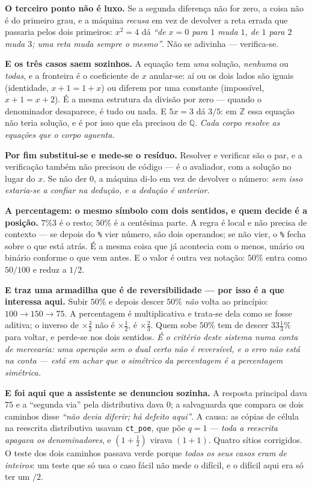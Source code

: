 \documentclass[11pt]{article}
\newcommand{\code}[1]{\texttt{\small #1}}
\theoremstyle{plain}
\theoremstyle{remark}
\begin{document}
\begin{itemize}
\textbf{O terceiro ponto não é luxo.} Se a segunda diferença não for zero, a coisa não é do
primeiro grau, e a máquina \emph{recusa} em vez de devolver a reta errada que passaria pelos dois
primeiros: $x^2 = 4$ dá \emph{``de $x{=}0$ para $1$ muda $1$, de $1$ para $2$ muda $3$; uma reta
muda sempre o mesmo''}. Não se adivinha --- verifica-se.

\textbf{E os três casos saem sozinhos.} A equação tem \emph{uma} solução, \emph{nenhuma} ou
\emph{todas}, e a fronteira é o coeficiente de $x$ anular-se: aí ou os dois lados são iguais
(identidade, $x+1 = 1+x$) ou diferem por uma constante (impossível, $x+1 = x+2$). É a mesma
estrutura da divisão por zero --- quando o denominador desaparece, é tudo ou nada. E $5x = 3$ dá
$3/5$: em $\mathbb{Z}$ essa equação não teria solução, e é por isso que ela precisou de
$\mathbb{Q}$. \emph{Cada corpo resolve as equações que o corpo aguenta.}

\textbf{Por fim substitui-se e mede-se o resíduo.} Resolver e verificar são o par, e a verificação
também não precisou de código --- é o avaliador, com a solução no lugar do $x$. Se não der $0$, a
máquina di-lo em vez de devolver o número: \emph{sem isso estaria-se a confiar na dedução, e a
dedução é anterior.}

\textbf{A percentagem: o mesmo símbolo com dois sentidos, e quem decide é a posição.} $7\%3$ é o
resto; $50\%$ é a centésima parte. A regra é local e não precisa de contexto --- se depois do
\code{\%} vier número, são dois operandos; se não vier, o \code{\%} fecha sobre o que está atrás.
É a mesma coisa que já acontecia com o menos, unário ou binário conforme o que vem antes. E o
valor é outra vez notação: $50\%$ entra como $50/100$ e reduz a $1/2$.

\textbf{E traz uma armadilha que é de reversibilidade --- por isso é a que interessa aqui.} Subir
$50\%$ e depois descer $50\%$ \emph{não} volta ao princípio: $100 \to 150 \to 75$. A percentagem é
multiplicativa e trata-se dela como se fosse aditiva; o inverso de $\times\frac{3}{2}$ não é
$\times\frac{1}{2}$, é $\times\frac{2}{3}$. Quem sobe $50\%$ tem de descer $33\frac{1}{3}\%$ para
voltar, e perde-se nos dois sentidos. \emph{É o critério deste sistema numa conta de mercearia:
uma operação sem o dual certo não é reversível, e o erro não está na conta --- está em achar que o
simétrico da percentagem é a percentagem simétrica.}

\textbf{E foi aqui que a assistente se denunciou sozinha.} A resposta principal dava $75$ e a
``segunda via'' pela distributiva dava $0$; a salvaguarda que compara os dois caminhos disse
\emph{``não devia diferir; há defeito aqui''}. A causa: as cópias de célula na reescrita
distributiva usavam \code{ct\_poe}, que põe $q = 1$ --- \emph{toda a reescrita apagava os
denominadores}, e $(1+\frac12)$ virava $(1+1)$. Quatro sítios corrigidos. O teste dos dois caminhos
passava verde porque \emph{todos os seus casos eram de inteiros}: um teste que só usa o caso fácil
não mede o difícil, e o difícil aqui era só ter um $/2$.


\end{itemize}
\end{document}
